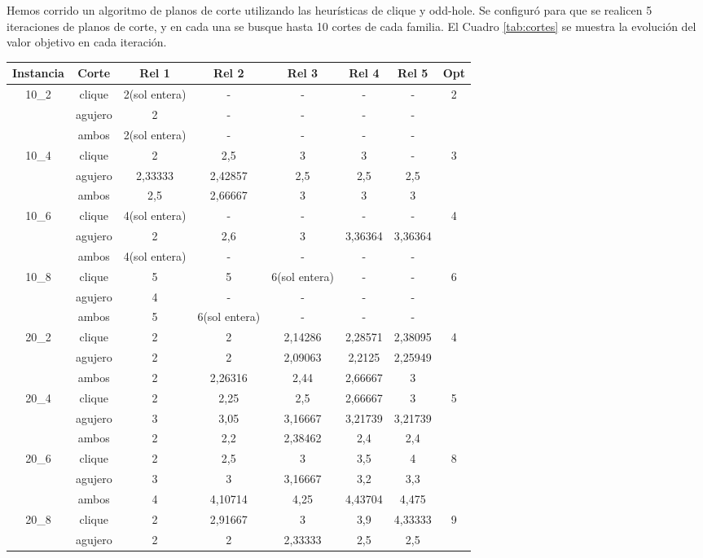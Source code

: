 \documentclass[a4paper]{article}
\begin{document}
Hemos corrido un algoritmo de planos de corte utilizando las heurísticas de clique y odd-hole.  Se configuró para que se realicen 5 iteraciones de planos de corte, y en cada una se busque hasta 10 cortes de cada familia.  El Cuadro \ref{tab:cortes} se muestra la evolución del valor objetivo en cada iteración.

\begin{center}
\begin{longtable}{|c|c|c|c|c|c|c|c|}
\hline
Instancia&Corte&Rel 1&Rel 2&Rel 3&Rel 4&Rel 5&Opt\\
\hline
\hline
10_2&clique&2(sol entera)&-&-&-&-&2\\
\cline{2-7}
&agujero&2&-&-&-&-&\\
\cline{2-7}
&ambos&2(sol entera)&-&-&-&-&\\
\hline
10_4&clique&2&2,5&3&3&-&3\\
\cline{2-7}
&agujero&2,33333&2,42857&2,5&2,5&2,5&\\
\cline{2-7}
&ambos&2,5&2,66667&3&3&3&\\
\hline
10_6&clique&4(sol entera)&-&-&-&-&4\\
\cline{2-7}
&agujero&2&2,6&3&3,36364&3,36364&\\
\cline{2-7}
&ambos&4(sol entera)&-&-&-&-&\\
\hline
10_8&clique&5&5&6(sol entera)&-&-&6\\
\cline{2-7}
&agujero&4&-&-&-&-&\\
\cline{2-7}
&ambos&5&6(sol entera)&-&-&-&\\
\hline
20_2&clique&2&2&2,14286&2,28571&2,38095&4\\
\cline{2-7}
&agujero&2&2&2,09063&2,2125&2,25949&\\
\cline{2-7}
&ambos&2&2,26316&2,44&2,66667&3&\\
\hline
20_4&clique&2&2,25&2,5&2,66667&3&5\\
\cline{2-7}
&agujero&3&3,05&3,16667&3,21739&3,21739&\\
\cline{2-7}
&ambos&2&2,2&2,38462&2,4&2,4&\\
\hline
20_6&clique&2&2,5&3&3,5&4&8\\
\cline{2-7}
&agujero&3&3&3,16667&3,2&3,3&\\
\cline{2-7}
&ambos&4&4,10714&4,25&4,43704&4,475&\\
\hline
20_8&clique&2&2,91667&3&3,9&4,33333&9\\
\cline{2-7}
&agujero&2&2&2,33333&2,5&2,5&\\
\cline{2-7}

\end{longtable}
\end{center}
\end{document}
